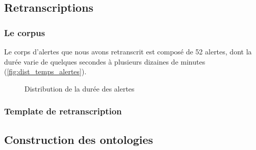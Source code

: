
\subsection{Retranscriptions}

\subsubsection{Le corpus}

Le corps d'alertes que nous avons retranscrit est composé de 52
alertes, dont la durée varie de quelques secondes à plusieurs dizaines
de minutes (\autoref{fig:dist_temps_alertes}).

\begin{figure}
  \centering
  
  \caption{Distribution de la durée des alertes}
  \label{fig:dist_temps_alertes}
\end{figure}

\subsubsection{Template de retranscription}

\subsection{Construction des ontologies}

